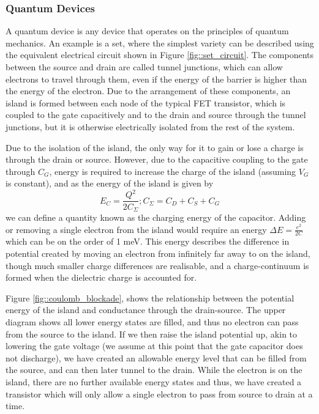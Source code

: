 \subsubsection{Quantum Devices}
	\label{sec::set}
	A quantum device is any device that operates on the principles of quantum mechanics. An example is a \gls{set}, where the simplest variety can be described using the equivalent electrical circuit \cite{devoret2000amplifying} shown in Figure \ref{fig::set_circuit}. The components between the source and drain are called tunnel junctions, which can allow electrons to travel through them, even if the energy of the barrier is higher than the energy of the electron. Due to the arrangement of these components, an island is formed between each node of the typical FET transistor, which is coupled to the gate capacitively and to the drain and source through the tunnel junctions, but it is otherwise electrically isolated from the rest of the system.
	
	Due to the isolation of the island, the only way for it to gain or lose a charge is through the drain or source. However, due to the capacitive coupling to the gate through $C_G$, energy is required to increase the charge of the island (assuming $V_G$ is constant), and as the energy of the island is given by $$E_C = \frac{Q^2}{2 C_\Sigma} ; C_\Sigma = C_D + C_S + C_G$$ we can define a quantity known as the charging energy of the capacitor. Adding or removing a single electron from the island would require an energy $\Delta E = \frac{e^2}{2 C}$ which can be on the order of 1 meV. This energy describes the difference in potential created by moving an electron from infinitely far away to on the island, though much smaller charge differences are realisable, and a charge-continuum is formed when the dielectric charge is accounted for.
	
	
	
	
	
	Figure \ref{fig::coulomb_blockade}, shows the relationship between the potential energy of the island and conductance through the drain-source. The upper diagram shows all lower energy states are filled, and thus no electron can pass from the source to the island. If we then raise the island potential up, akin to lowering the gate voltage
	 (we assume at this point that the gate capacitor does not discharge), 
	 we have created an allowable energy level that can be filled from the source, and can then later tunnel to the drain. While the electron is on the island, there are no further available energy states and thus, we have created a transistor which will only allow a single electron to pass from source to drain at a time.
	
